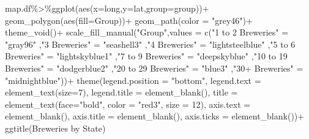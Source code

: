 \documentclass[
]{article}
\newenvironment{Shaded}{\begin{snugshade}}{\end{snugshade}}
\newcommand{\AttributeTok}[1]{\textcolor[rgb]{0.77,0.63,0.00}{#1}}
\newcommand{\DecValTok}[1]{\textcolor[rgb]{0.00,0.00,0.81}{#1}}
\newcommand{\FunctionTok}[1]{\textcolor[rgb]{0.00,0.00,0.00}{#1}}
\newcommand{\NormalTok}[1]{#1}
\newcommand{\OtherTok}[1]{\textcolor[rgb]{0.56,0.35,0.01}{#1}}
\newcommand{\SpecialCharTok}[1]{\textcolor[rgb]{0.00,0.00,0.00}{#1}}
\newcommand{\StringTok}[1]{\textcolor[rgb]{0.31,0.60,0.02}{#1}}
\begin{document}
\begin{Shaded}
\begin{Highlighting}[]
\NormalTok{map.df}\SpecialCharTok{\%\textgreater{}\%}\FunctionTok{ggplot}\NormalTok{(}\FunctionTok{aes}\NormalTok{(}\AttributeTok{x=}\NormalTok{long,}\AttributeTok{y=}\NormalTok{lat,}\AttributeTok{group=}\NormalTok{group))}\SpecialCharTok{+}
  \FunctionTok{geom\_polygon}\NormalTok{(}\FunctionTok{aes}\NormalTok{(}\AttributeTok{fill=}\NormalTok{Group))}\SpecialCharTok{+}
  \FunctionTok{geom\_path}\NormalTok{(}\AttributeTok{color =} \StringTok{"grey46"}\NormalTok{)}\SpecialCharTok{+}
  \FunctionTok{theme\_void}\NormalTok{()}\SpecialCharTok{+}
  \FunctionTok{scale\_fill\_manual}\NormalTok{(}\StringTok{"Group"}\NormalTok{,}\AttributeTok{values =} \FunctionTok{c}\NormalTok{(}\StringTok{"1 to 2 Breweries"} \OtherTok{=} \StringTok{"gray96"}
\NormalTok{                                       ,}\StringTok{"3 Breweries"} \OtherTok{=} \StringTok{"seashell3"}
\NormalTok{                                       ,}\StringTok{"4 Breweries"} \OtherTok{=} \StringTok{"lightsteelblue"}
\NormalTok{                                       ,}\StringTok{"5 to 6 Breweries"}  \OtherTok{=} \StringTok{"lightskyblue1"}
\NormalTok{                                       ,}\StringTok{"7 to 9 Breweries"} \OtherTok{=} \StringTok{"deepskyblue"}
\NormalTok{                                       ,}\StringTok{"10 to 19 Breweries"} \OtherTok{=} \StringTok{"dodgerblue2"}
\NormalTok{                                       ,}\StringTok{"20 to 29 Breweries"} \OtherTok{=} \StringTok{"blue3"}
\NormalTok{                                       ,}\StringTok{"30+ Breweries"} \OtherTok{=} \StringTok{"midnightblue"}\NormalTok{))}\SpecialCharTok{+}
  \FunctionTok{theme}\NormalTok{(}\AttributeTok{legend.position =} \StringTok{"bottom"}\NormalTok{,}
        \AttributeTok{legend.text =} \FunctionTok{element\_text}\NormalTok{(}\AttributeTok{size=}\DecValTok{7}\NormalTok{),}
        \AttributeTok{legend.title =} \FunctionTok{element\_blank}\NormalTok{(),}
        \AttributeTok{title =} \FunctionTok{element\_text}\NormalTok{(}\AttributeTok{face=}\StringTok{"bold"}\NormalTok{, }\AttributeTok{color =} \StringTok{"red3"}\NormalTok{, }\AttributeTok{size =} \DecValTok{12}\NormalTok{),}
        \AttributeTok{axis.text =} \FunctionTok{element\_blank}\NormalTok{(),}
        \AttributeTok{axis.title =} \FunctionTok{element\_blank}\NormalTok{(),}
        \AttributeTok{axis.ticks =} \FunctionTok{element\_blank}\NormalTok{())}\SpecialCharTok{+}
  \FunctionTok{ggtitle}\NormalTok{(}\StringTok{\textquotesingle{}Breweries by State\textquotesingle{}}\NormalTok{)}
\end{Highlighting}
\end{Shaded}
\end{document}
